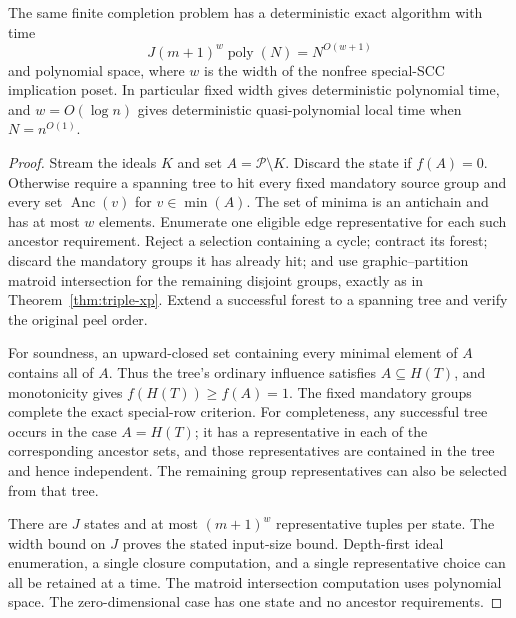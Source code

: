 \begin{theorem}
\label{thm:deterministic-width}
The same finite completion problem has a deterministic exact algorithm
with time
\[
                   J(m+1)^w\operatorname{poly}(N)
                            =N^{O(w+1)}
\]
and polynomial space, where $w$ is the width of the nonfree special-SCC
implication poset.  In particular fixed width gives deterministic
polynomial time, and $w=O(\log n)$ gives deterministic quasi-polynomial
local time when $N=n^{O(1)}$.
\end{theorem}
\begin{proof}
Stream the ideals $K$ and set $A=\mathcal P\setminus K$.  Discard the
state if $f(A)=0$.  Otherwise require a spanning tree to hit every fixed
mandatory source group and every set $\operatorname{Anc}(v)$ for
$v\in\min(A)$.  The set of minima is an antichain and has at most $w$
elements.  Enumerate one eligible edge representative for each such
ancestor requirement.  Reject a selection containing a cycle; contract
its forest; discard the mandatory groups it has already hit; and use
graphic--partition matroid intersection for the remaining disjoint groups,
exactly as in Theorem~\ref{thm:triple-xp}.  Extend a successful forest to
a spanning tree and verify the original peel order.

For soundness, an upward-closed set containing every minimal element of
$A$ contains all of $A$.  Thus the tree's ordinary influence satisfies
$A\subseteq H(T)$, and monotonicity gives $f(H(T))\geq f(A)=1$.
The fixed mandatory groups complete the exact special-row criterion.
For completeness, any successful tree occurs in the case $A=H(T)$;
it has a representative in each of the corresponding ancestor sets,
and those representatives are contained in the tree and hence independent.
The remaining group representatives can also be selected from that tree.

There are $J$ states and at most $(m+1)^w$ representative tuples per state.
The width bound on $J$ proves the stated input-size bound.  Depth-first
ideal enumeration, a single closure computation, and a single
representative choice can all be retained at a time.  The matroid
intersection computation uses polynomial space.  The zero-dimensional
case has one state and no ancestor requirements.
\end{proof}
